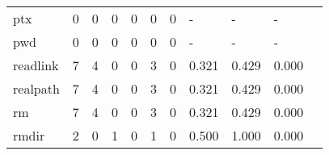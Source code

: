 \begin{longtable}{lp{1.2cm}p{1.2cm}p{1.2cm}p{1.2cm}p{1.2cm}p{1.2cm}p{1.2cm}p{1.2cm}p{1.2cm}p{1.2cm}}
ptx       &                                     0 &                                                  0 &                                                0 &                                               0 &                                                0 &                                              0 &                                             - &                                                  - &                                                  - \\
pwd       &                                     0 &                                                  0 &                                                0 &                                               0 &                                                0 &                                              0 &                                             - &                                                  - &                                                  - \\
readlink  &                                     7 &                                                  4 &                                                0 &                                               0 &                                                3 &                                              0 &                                         0.321 &                                              0.429 &                                              0.000 \\
realpath  &                                     7 &                                                  4 &                                                0 &                                               0 &                                                3 &                                              0 &                                         0.321 &                                              0.429 &                                              0.000 \\
rm        &                                     7 &                                                  4 &                                                0 &                                               0 &                                                3 &                                              0 &                                         0.321 &                                              0.429 &                                              0.000 \\
rmdir     &                                     2 &                                                  0 &                                                1 &                                               0 &                                                1 &                                              0 &                                         0.500 &                                              1.000 &                                              0.000 \\

\end{longtable}
